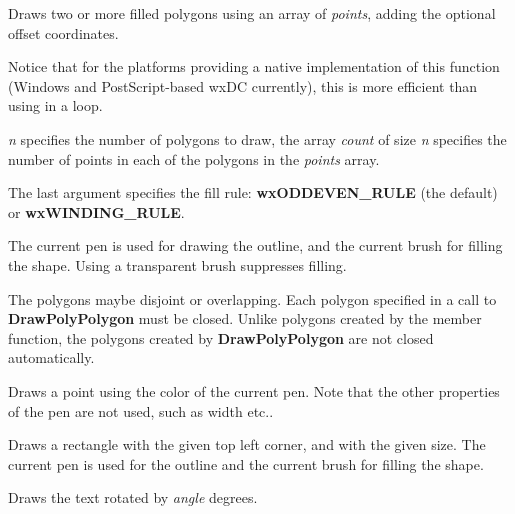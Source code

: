 Draws two or more filled polygons using an array of {\it points}, adding the
optional offset coordinates.

Notice that for the platforms providing a native implementation
of this function (Windows and PostScript-based wxDC currently), this is more
efficient than using  in a loop.

{\it n} specifies the number of polygons to draw, the array {\it count} of size 
{\it n} specifies the number of points in each of the polygons in the 
{\it points} array.

The last argument specifies the fill rule: {\bf wxODDEVEN\_RULE} (the default)
or {\bf wxWINDING\_RULE}.

The current pen is used for drawing the outline, and the current brush for
filling the shape.  Using a transparent brush suppresses filling.

The polygons maybe disjoint or overlapping. Each polygon specified in a call to
{\bf DrawPolyPolygon} must be closed. Unlike polygons created by the
 member function, the polygons created by
{\bf DrawPolyPolygon} are not closed automatically.




\label{wxdcdrawpoint}


Draws a point using the color of the current pen. Note that the other properties of the pen are not used, such as width etc..


\label{wxdcdrawrectangle}


Draws a rectangle with the given top left corner, and with the given
size.  The current pen is used for the outline and the current brush
for filling the shape.


\label{wxdcdrawrotatedtext}


Draws the text rotated by {\it angle} degrees.

